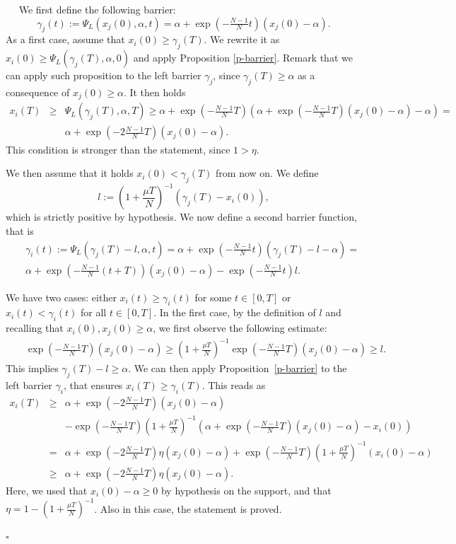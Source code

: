 \documentclass[journal]{article}
\newenvironment{proof}{{\it Proof.}~~}{\hfill$\square$}
\begin{document}
\begin{proof}
We first define the following barrier: $$\gamma_j(t):=\Psi_L(x_j(0),\alpha,t)=\alpha+\exp(-\tfrac{N-1}{N}t)(x_j(0)-\alpha).$$
As a first case, assume that $x_i(0)\geq \gamma_j(T)$. We rewrite it as $x_i(0)\geq \Psi_L(\gamma_j(T),\alpha,0)$  and apply Proposition \ref{p-barrier}. Remark that we can apply such proposition
to the left barrier $\gamma_j$, since $\gamma_j(T)\geq \alpha$ as a consequence of $x_j(0)\geq\alpha$. It then holds
\begin{eqnarray*}
x_i(T)&\geq& \Psi_L(\gamma_j(T),\alpha,T)\geq \alpha+\exp(-\tfrac{N-1}{N}T)(\alpha+\exp(-\tfrac{N-1}{N}T)(x_j(0)-\alpha)-\alpha)=\\
&&\alpha+\exp(-2\tfrac{N-1}{N}T)(x_j(0)-\alpha).
\end{eqnarray*}
This condition is stronger than the statement, since $1>\eta$.


We then assume that it holds $x_i(0)<\gamma_j(T)$ from now on. We define 
$$l:=\left(1+\frac{\mu T}N\right)^{-1}(\gamma_j(T)-x_i(0)),$$
which is strictly positive by hypothesis. We now define a second barrier function, that is
\begin{eqnarray*}
&&\gamma_i(t):=\Psi_L(\gamma_j(T)-l,\alpha,t)=\alpha+\exp(-\tfrac{N-1}{N}t)(\gamma_j(T)-l-\alpha)=\\
&&\alpha+\exp(-\tfrac{N-1}{N}(t+T))(x_j(0)-\alpha)-\exp(-\tfrac{N-1}{N}t)l.
\end{eqnarray*}

We have two cases: either $x_i(t)\geq \gamma_i(t)$ for some $t\in[0,T]$ or $x_i(t)< \gamma_i(t)$ for all $t\in[0,T]$. In the first case, by the definition of $l$ and recalling that $x_i(0),x_j(0)\geq\alpha$, we first observe the following estimate:
\begin{eqnarray*}
&&\exp(-\tfrac{N-1}{N}T)(x_j(0)-\alpha)\geq \left(1+\frac{\mu T}N\right)^{-1}\exp(-\tfrac{N-1}{N}T)(x_j(0)-\alpha) \geq l.
\end{eqnarray*}
This implies 
$\gamma_j(T)-l\geq \alpha$. We can then apply Proposition~\ref{p-barrier} to the left barrier $\gamma_i$, that ensures $x_i(T)\geq\gamma_i(T)$. This reads as
\begin{eqnarray*}
x_i(T)&\geq& \alpha+\exp(-2\tfrac{N-1}{N}T)(x_j(0)-\alpha)\\
&&-\exp(-\tfrac{N-1}{N}T)\left(1+\frac{\mu T}N\right)^{-1}(\alpha+\exp(-\tfrac{N-1}{N}T)(x_j(0)-\alpha)-x_i(0))\\
&=& \alpha+\exp(-2\tfrac{N-1}{N}T)\eta (x_j(0)-\alpha)+\exp(-\tfrac{N-1}{N}T)\left(1+\frac{\mu T}N\right)^{-1}(x_i(0)-\alpha)\\
&\geq& \alpha+\exp(-2\tfrac{N-1}{N}T)\eta (x_j(0)-\alpha).
\end{eqnarray*}
Here, we used that $x_i(0)-\alpha\geq 0$ by hypothesis on the support, and that $\eta=1-\left(1+\frac{\mu T}N\right)^{-1}$. Also in this case, the statement is proved.


\end{proof}
\end{document}
